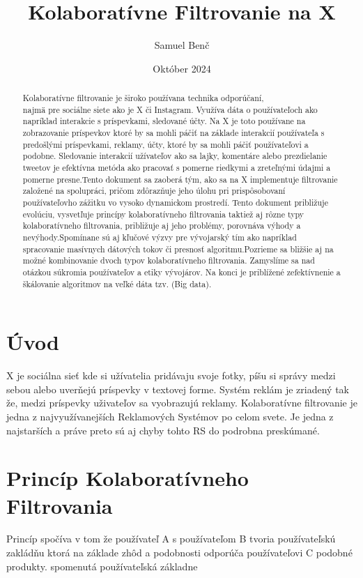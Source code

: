\documentclass{article}
\title{Kolaboratívne Filtrovanie na X}
\author{Samuel Benč}
\date{Október 2024}
\begin{document}
\maketitle

\begin{abstract}
Kolaboratívne filtrovanie je široko používana technika odporúčaní, \\ najmä pre sociálne siete ako je X či Instagram. Využíva dáta o používateľoch ako napríklad interakcie s príspevkami, sledované účty. Na X je toto používane na zobrazovanie príspevkov ktoré by sa mohli páčiť na základe interakcií používateľa s predošlými príspevkami, reklamy, účty, ktoré by sa mohli páčiť používateľovi a podobne. Sledovanie interakcií užívateľov ako sa lajky, komentáre alebo prezdielanie tweetov je efektívna metóda ako pracovať s pomerne riedkymi a zreteľnými údajmi a pomerne presne.Tento dokument sa zaoberá tým, ako sa na X implementuje filtrovanie založené na spolupráci, pričom
zdôrazňuje jeho úlohu pri prispôsobovaní používateľovho zážitku vo vysoko dynamickom prostredí. Tento dokument približuje evolúciu, vysvetľuje princípy kolaboratívneho filtrovania taktiež aj rôzne typy kolaboratívneho filtrovania, približuje aj jeho problémy, porovnáva výhody a nevýhody.Spomínane sú aj kľučové výzvy pre vývojarský tím ako napríklad spracovanie masívnych dátových tokov či presnosť algoritmu.Pozrieme sa bližšie aj na možné kombinovanie dvoch typov kolaboratívneho filtrovania. Zamyslíme sa nad otázkou súkromia používateľov a etiky vývojárov. Na konci je priblížené zefektívnenie a škálovanie algoritmov na veľké dáta tzv. (Big data).
\end{abstract}

\section{Úvod}

X je sociálna sieť kde si užívatelia pridávaju svoje fotky, píšu si správy medzi sebou alebo uverňejú príspevky v textovej forme. Systém reklám je zriadený tak že, medzi príspevky uživateľov
sa vyobrazujú reklamy. Kolaboratívne filtrovanie je jedna z najvyužívanejších Reklamových Systémov po celom svete. Je jedna z najstarších a práve preto sú aj chyby tohto RS do podrobna preskúmané.
\newpage

\section{Princíp Kolaboratívneho Filtrovania}
Princíp spočíva v tom že používateľ A s používateľom B tvoria používateľskú zakládňu
ktorá na základe zhôd a podobnosti odporúča používateľovi C podobné produkty.
spomenutá používateľská základne
\end{document}

